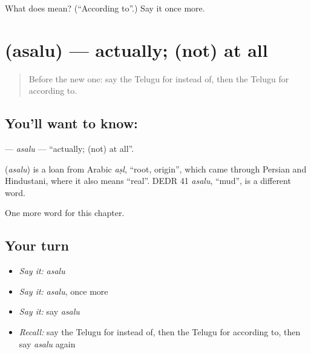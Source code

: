 \begin{tcolorbox}[breakable,colback=teal!4,colframe=teal!35!black,title={Before you move on}]
What does  mean? (\textquotedblleft{}According to\textquotedblright{}.) Say it once more.
\end{tcolorbox}
\section[\texorpdfstring{\te{అసలు} (asalu)}{అసలు (asalu)}]{ (asalu) — actually; (not) at all}

\label{lesson:TE-C177-asalu}



\begin{quote}
Before the new one: say the Telugu for instead of, then the Telugu for according to.
\end{quote}

\subsection*{You'll want to know: }
\textbf{} — \emph{asalu} — \textquotedblleft{}actually; (not) at all\textquotedblright{}.

\begin{cousinweb}
\textbf{} (\emph{asalu}) is a loan from Arabic \emph{aṣl}, \textquotedblleft{}root, origin\textquotedblright{}, which came through Persian and Hindustani, where it also means \textquotedblleft{}real\textquotedblright{}. DEDR 41 \emph{asalu}, \textquotedblleft{}mud\textquotedblright{}, is a different word.
\end{cousinweb}

\begin{grammarlens}[title={What you've built}]
One more word for this chapter.
\end{grammarlens}

\subsection*{Your turn}
\begin{itemize}
\raggedright
  \item \emph{Say it:} \emph{asalu}
  \item \emph{Say it:} \emph{asalu}, once more
  \item \emph{Say it:} say \emph{asalu}
  \item \emph{Recall:} say the Telugu for instead of, then the Telugu for according to, then say \emph{asalu} again
\end{itemize}


